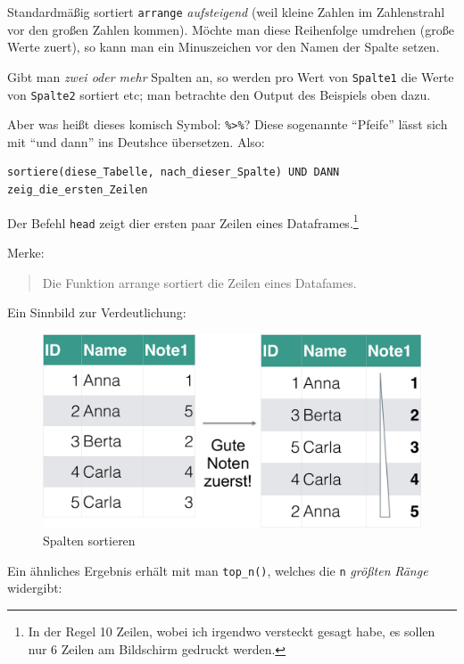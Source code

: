 \documentclass[12pt,]{book}
\let\rmarkdownfootnote\footnote%
\def\footnote{\protect\rmarkdownfootnote}
\begin{document}
Standardmäßig sortiert \texttt{arrange} \emph{aufsteigend} (weil kleine
Zahlen im Zahlenstrahl vor den großen Zahlen kommen). Möchte man diese
Reihenfolge umdrehen (große Werte zuert), so kann man ein Minuszeichen
vor den Namen der Spalte setzen.

Gibt man \emph{zwei oder mehr} Spalten an, so werden pro Wert von
\texttt{Spalte1} die Werte von \texttt{Spalte2} sortiert etc; man
betrachte den Output des Beispiels oben dazu.

Aber was heißt dieses komisch Symbol: \texttt{\%\textgreater{}\%}? Diese
sogenannte ``Pfeife'' lässt sich mit ``und dann'' ins Deutshce
übersetzen. Also:

\begin{verbatim}
sortiere(diese_Tabelle, nach_dieser_Spalte) UND DANN zeig_die_ersten_Zeilen
\end{verbatim}

Der Befehl \texttt{head} zeigt dier ersten paar Zeilen eines
Dataframes.\footnote{In der Regel 10 Zeilen, wobei ich irgendwo
  versteckt gesagt habe, es sollen nur 6 Zeilen am Bildschirm gedruckt
  werden.}

Merke:

\begin{quote}
Die Funktion arrange sortiert die Zeilen eines Datafames.
\end{quote}

Ein Sinnbild zur Verdeutlichung:

\begin{figure}

{\centering \includegraphics[width=0.7\linewidth]{./images/arrange} 

}

\caption{Spalten sortieren}\label{fig:fig-arrange}
\end{figure}

Ein ähnliches Ergebnis erhält mit man \texttt{top\_n()}, welches die
\texttt{n} \emph{größten} \emph{Ränge} widergibt:
\end{document}

